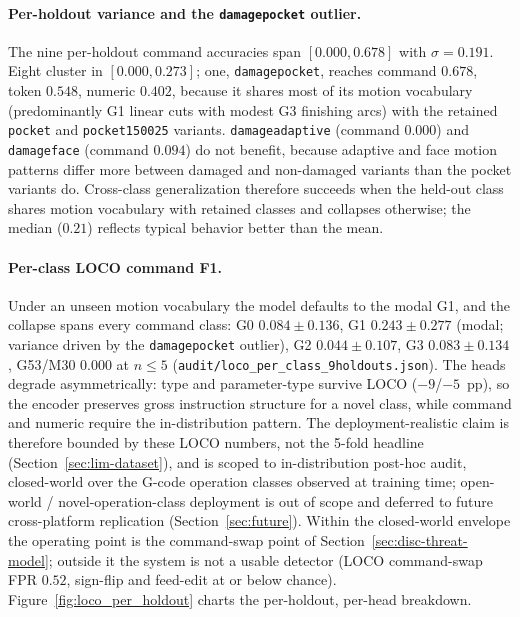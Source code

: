 \documentclass[sensors,article,submit,moreauthors,pdftex]{Definitions/mdpi}
\begin{document}
\paragraph{Per-holdout variance and the \texttt{damagepocket} outlier.} The nine per-holdout command accuracies span $[0.000, 0.678]$ with $\sigma = 0.191$. Eight cluster in $[0.000, 0.273]$; one, \texttt{damagepocket}, reaches command $0.678$, token $0.548$, numeric $0.402$, because it shares most of its motion vocabulary (predominantly G1 linear cuts with modest G3 finishing arcs) with the retained \texttt{pocket} and \texttt{pocket150025} variants. \texttt{damageadaptive} (command $0.000$) and \texttt{damageface} (command $0.094$) do not benefit, because adaptive and face motion patterns differ more between damaged and non-damaged variants than the pocket variants do. Cross-class generalization therefore succeeds when the held-out class shares motion vocabulary with retained classes and collapses otherwise; the median ($0.21$) reflects typical behavior better than the mean.

\paragraph{Per-class LOCO command F1.} Under an unseen motion vocabulary the model defaults to the modal G1, and the collapse spans every command class: G0 $0.084 \pm 0.136$, G1 $0.243 \pm 0.277$ (modal; variance driven by the \texttt{damagepocket} outlier), G2 $0.044 \pm 0.107$, G3 $0.083 \pm 0.134$, G53/M30 $0.000$ at $n\!\le\!5$ (\texttt{audit/loco\_per\_class\_9holdouts.json}). The heads degrade asymmetrically: type and parameter-type survive LOCO ($-9$/$-5$~pp), so the encoder preserves gross instruction structure for a novel class, while command and numeric require the in-distribution pattern. The deployment-realistic claim is therefore bounded by these LOCO numbers, not the 5-fold headline (Section~\ref{sec:lim-dataset}), and is scoped to in-distribution post-hoc audit, closed-world over the G-code operation classes observed at training time; open-world / novel-operation-class deployment is out of scope and deferred to future cross-platform replication (Section~\ref{sec:future}). Within the closed-world envelope the operating point is the command-swap point of Section~\ref{sec:disc-threat-model}; outside it the system is not a usable detector (LOCO command-swap FPR $0.52$, sign-flip and feed-edit at or below chance). Figure~\ref{fig:loco_per_holdout} charts the per-holdout, per-head breakdown.
\end{document}

